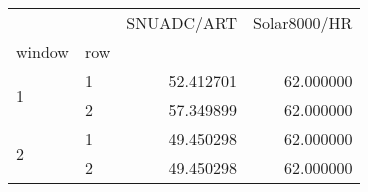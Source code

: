 \begin{tabular}{llrr}
\toprule
 &  & SNUADC/ART & Solar8000/HR \\
window & row &  &  \\
\midrule
\multirow[t]{2}{*}{1} & 1 & 52.412701 & 62.000000 \\
 & 2 & 57.349899 & 62.000000 \\
\cline{1-4}
\multirow[t]{2}{*}{2} & 1 & 49.450298 & 62.000000 \\
 & 2 & 49.450298 & 62.000000 \\
\cline{1-4}
\bottomrule
\end{tabular}
